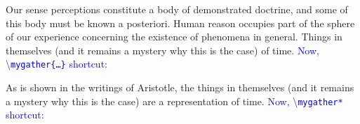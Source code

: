 \documentclass[phd,showframe]{ndsu-thesis-2022}
\newcommand\italk[1]{\textcolor{blue}{#1}}  %
\newcommand\cmd[1]{\textbackslash\texttt{#1}}  %
\begin{document}
Our sense perceptions constitute a body of demonstrated doctrine, and some of this body must be known a posteriori. Human reason occupies part of the sphere of our experience concerning the existence of phenomena in general. Things in themselves (and it remains a mystery why this is the case) of time. \italk{Now, \cmd{mygather\{\ldots\}} shortcut:}


\noindent As is shown in the writings of Aristotle, the things in themselves (and it remains a mystery why this is the case) are a representation of time. \italk{Now, \cmd{mygather*} shortcut:}


\end{document}
